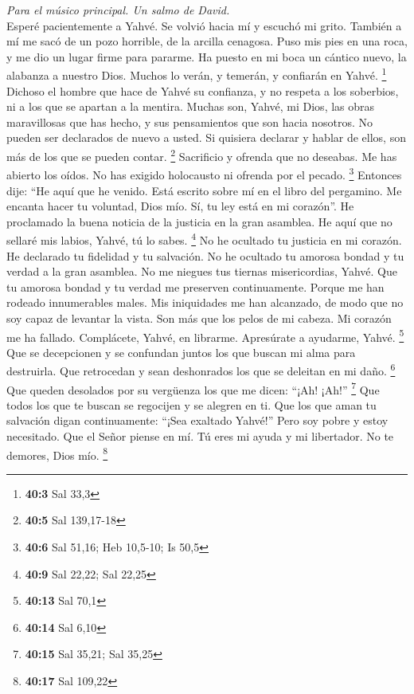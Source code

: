 \begin{paracol}{2}
\emph{Para el músico principal. Un salmo de David.}\\
 Esperé pacientemente a Yahvé. Se volvió hacia mí y
escuchó mi grito.  También a mí me sacó de un pozo
horrible, de la arcilla cenagosa. Puso mis pies en una roca, y me dio un
lugar firme para pararme.  Ha puesto en mi boca un cántico
nuevo, la alabanza a nuestro Dios. Muchos lo verán, y temerán, y
confiarán en Yahvé. \footnote{\textbf{40:3} Sal 33,3} 
Dichoso el hombre que hace de Yahvé su confianza, y no respeta a los
soberbios, ni a los que se apartan a la mentira.  Muchas
son, Yahvé, mi Dios, las obras maravillosas que has hecho, y sus
pensamientos que son hacia nosotros. No pueden ser declarados de nuevo a
usted. Si quisiera declarar y hablar de ellos, son más de los que se
pueden contar. \footnote{\textbf{40:5} Sal 139,17-18} 
Sacrificio y ofrenda que no deseabas. Me has abierto los oídos. No has
exigido holocausto ni ofrenda por el pecado. \footnote{\textbf{40:6} Sal
  51,16; Heb 10,5-10; Is 50,5}  Entonces dije: ``He aquí
que he venido. Está escrito sobre mí en el libro del pergamino.
 Me encanta hacer tu voluntad, Dios mío. Sí, tu ley está
en mi corazón''.  He proclamado la buena noticia de la
justicia en la gran asamblea. He aquí que no sellaré mis labios, Yahvé,
tú lo sabes. \footnote{\textbf{40:9} Sal 22,22; Sal 22,25}
 No he ocultado tu justicia en mi corazón. He declarado
tu fidelidad y tu salvación. No he ocultado tu amorosa bondad y tu
verdad a la gran asamblea.  No me niegues tus tiernas
misericordias, Yahvé. Que tu amorosa bondad y tu verdad me preserven
continuamente.  Porque me han rodeado innumerables males.
Mis iniquidades me han alcanzado, de modo que no soy capaz de levantar
la vista. Son más que los pelos de mi cabeza. Mi corazón me ha fallado.
 Complácete, Yahvé, en librarme. Apresúrate a ayudarme,
Yahvé. \footnote{\textbf{40:13} Sal 70,1}  Que se
decepcionen y se confundan juntos los que buscan mi alma para
destruirla. Que retrocedan y sean deshonrados los que se deleitan en mi
daño. \footnote{\textbf{40:14} Sal 6,10}  Que queden
desolados por su vergüenza los que me dicen: ``¡Ah! ¡Ah!'' \footnote{\textbf{40:15}
  Sal 35,21; Sal 35,25}  Que todos los que te buscan se
regocijen y se alegren en ti. Que los que aman tu salvación digan
continuamente: ``¡Sea exaltado Yahvé!''  Pero soy pobre y
estoy necesitado. Que el Señor piense en mí. Tú eres mi ayuda y mi
libertador. No te demores, Dios mío. \footnote{\textbf{40:17} Sal 109,22}


\end{paracol}
